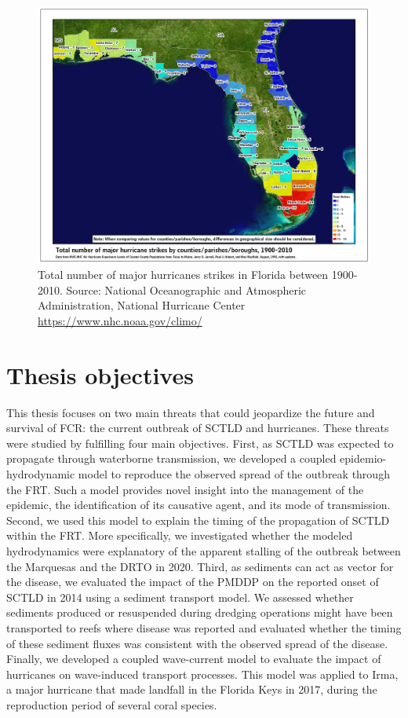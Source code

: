 \begin{figure}
    \centering
    \includegraphics[width=\textwidth]{chapters/intro/figures/hurricane_strikes.jpg}
    \caption{Total number of major hurricanes strikes in Florida between 1900-2010. Source: National Oceanographic and Atmospheric Administration, National Hurricane Center \url{https://www.nhc.noaa.gov/climo/}}
    \label{inro:landfall}
\end{figure}

\section{Thesis objectives}

This thesis focuses on two main threats that could jeopardize the future and survival of FCR: the current outbreak of SCTLD and hurricanes. These threats were studied by fulfilling four main objectives. First, as SCTLD was expected to propagate through waterborne transmission, we developed a coupled epidemio-hydrodynamic model to reproduce the observed spread of the outbreak through the FRT. Such a model provides novel insight into the management of the epidemic, the identification of its causative agent, and its mode of transmission. Second, we used this model to explain the timing of the propagation of SCTLD within the FRT. More specifically, we investigated whether the modeled hydrodynamics were explanatory of the apparent stalling of the outbreak between the Marquesas and the DRTO in 2020. Third, as sediments can act as vector for the disease, we evaluated the impact of the PMDDP on the reported onset of SCTLD in 2014 using a sediment transport model. We assessed whether sediments produced or resuspended during dredging operations might have been transported to reefs where disease was reported and evaluated whether the timing of these sediment fluxes was consistent with the observed spread of the disease. Finally, we developed a coupled wave-current model to evaluate the impact of hurricanes on wave-induced transport processes. This model was applied to Irma, a major hurricane that made landfall in the Florida Keys in 2017, during the reproduction period of several coral species.

